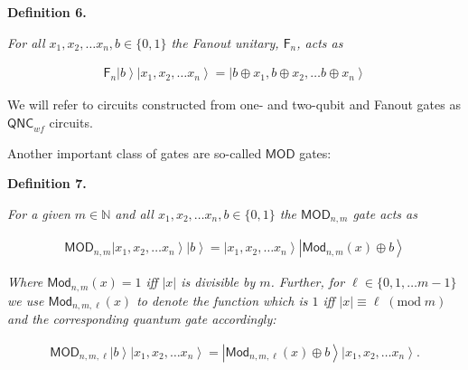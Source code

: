 

\par\medskip\noindent\textbf{
\textbf{Definition 6}\textbf{.}
}\par



\emph{For all $x_{1},x_{2},\dots x_{n},b\in\{0,1\}$ the Fanout unitary, $\mathsf{F}_{n}$, acts as}\par


\[\begin{gathered}
\displaystyle\mathsf{F}_{n}\left|b\right\rangle\left|x_{1},x_{2},\dots x_{n}\right\rangle=\left|b\oplus x_{1},b\oplus x_{2},\dots b\oplus x_{n}\right\rangle
\end{gathered}\]






We will refer to circuits constructed from one- and two-qubit and Fanout gates as ${\mathsf{QNC}}_{wf}$ circuits.\par




Another important class of gates are so-called $\mathsf{MOD}$ gates:\par





\par\medskip\noindent\textbf{
\textbf{Definition 7}\textbf{.}
}\par



\emph{For a given $m\in\mathbb{N}$ and all $x_{1},x_{2},\dots x_{n},b\in\{0,1\}$ the $\mathsf{MOD}_{n,m}$ gate acts as}\par


\[\begin{gathered}
\displaystyle\mathsf{MOD}_{n,m}\left|x_{1},x_{2},\dots x_{n}\right\rangle\left|b\right\rangle=\left|x_{1},x_{2},\dots x_{n}\right\rangle\left|{\mathsf{Mod}}_{n,m}(x)\oplus b\right\rangle
\end{gathered}\]


\emph{Where ${\mathsf{Mod}}_{n,m}(x)=1$ iff $|x|$ is divisible by $m$. Further, for $\ell\in\{0,1,\dots m-1\}$ we use ${\mathsf{Mod}}_{n,m,\ell}(x)$ to denote the function which is $1$ iff $|x|\equiv\ell\;(\mathrm{mod}\;m)$ and the corresponding quantum gate accordingly:}\par


\[\begin{gathered}
\displaystyle\mathsf{MOD}_{n,m,\ell}\left|b\right\rangle\left|x_{1},x_{2},\dots x_{n}\right\rangle=\left|{\mathsf{Mod}}_{n,m,\ell}(x)\oplus b\right\rangle\left|x_{1},x_{2},\dots x_{n}\right\rangle.
\end{gathered}\]



